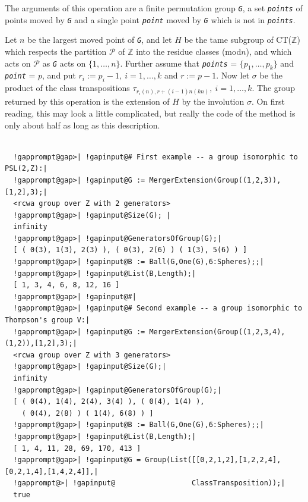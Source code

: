 \documentclass[a4paper,11pt]{report}
\begin{document}
{{{ The arguments of this operation are a finite permutation group \mbox{\texttt{\mdseries\slshape G}}, a set \mbox{\texttt{\mdseries\slshape points}} of points moved by \mbox{\texttt{\mdseries\slshape G}} and a single point \mbox{\texttt{\mdseries\slshape point}} moved by \mbox{\texttt{\mdseries\slshape G}} which is not in \mbox{\texttt{\mdseries\slshape points}}. 

 Let $n$ be the largest moved point of \mbox{\texttt{\mdseries\slshape G}}, and let $H$ be the tame subgroup of CT({\ensuremath{\mathbb Z}}) which respects the
partition $\mathcal{P}$ of {\ensuremath{\mathbb Z}} into the residue classes (mod{\nobreakspace}$n$), and which acts on $\mathcal{P}$ as \mbox{\texttt{\mdseries\slshape G}} acts on $\{1, \dots, n\}$. Further assume that \mbox{\texttt{\mdseries\slshape points}} = $\{p_1, \dots, p_k\}$ and \mbox{\texttt{\mdseries\slshape point}} = $p$, and put $r_i := p_i-1, \ i = 1, \dots, k$ and $r := p-1$. Now let $\sigma$ be the product of the class transpositions $\tau_{r_i(n),r+(i-1)n(kn)}, \ i = 1, \dots, k$. The group returned by this operation is the extension of $H$ by the involution $\sigma$. \texttt{}\texttt{} On first reading, this may look a
little complicated, but really the code of the method is only about half as
long as this description. 
\begin{Verbatim}[commandchars=!@|,fontsize=\small,frame=single,label=Example]
  
  !gapprompt@gap>| !gapinput@# First example -- a group isomorphic to PSL(2,Z):|
  !gapprompt@gap>| !gapinput@G := MergerExtension(Group((1,2,3)),[1,2],3);|
  <rcwa group over Z with 2 generators>
  !gapprompt@gap>| !gapinput@Size(G); |
  infinity
  !gapprompt@gap>| !gapinput@GeneratorsOfGroup(G);|
  [ ( 0(3), 1(3), 2(3) ), ( 0(3), 2(6) ) ( 1(3), 5(6) ) ]
  !gapprompt@gap>| !gapinput@B := Ball(G,One(G),6:Spheres);;|
  !gapprompt@gap>| !gapinput@List(B,Length);|
  [ 1, 3, 4, 6, 8, 12, 16 ]
  !gapprompt@gap>| !gapinput@#|
  !gapprompt@gap>| !gapinput@# Second example -- a group isomorphic to Thompson's group V:|
  !gapprompt@gap>| !gapinput@G := MergerExtension(Group((1,2,3,4),(1,2)),[1,2],3);|
  <rcwa group over Z with 3 generators>
  !gapprompt@gap>| !gapinput@Size(G);|
  infinity
  !gapprompt@gap>| !gapinput@GeneratorsOfGroup(G);|
  [ ( 0(4), 1(4), 2(4), 3(4) ), ( 0(4), 1(4) ),
    ( 0(4), 2(8) ) ( 1(4), 6(8) ) ]
  !gapprompt@gap>| !gapinput@B := Ball(G,One(G),6:Spheres);;|
  !gapprompt@gap>| !gapinput@List(B,Length);|
  [ 1, 4, 11, 28, 69, 170, 413 ]
  !gapprompt@gap>| !gapinput@G = Group(List([[0,2,1,2],[1,2,2,4],[0,2,1,4],[1,4,2,4]],|
  !gapprompt@>| !gapinput@                  ClassTransposition));|
  true
  

\end{Verbatim}}}}
\end{document}
